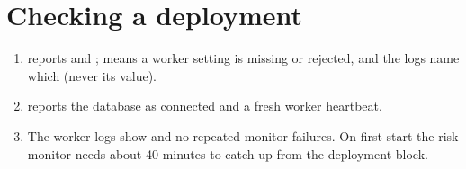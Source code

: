 \section{Checking a deployment}

\begin{enumerate}
  \item {} reports  and ;  means a worker setting is missing or rejected, and the logs name which (never its value).
  \item {} reports the database as connected and a fresh worker heartbeat.
  \item The worker logs show  and no repeated monitor failures. On first start the risk monitor needs about 40 minutes to catch up from the deployment block.
\end{enumerate}
